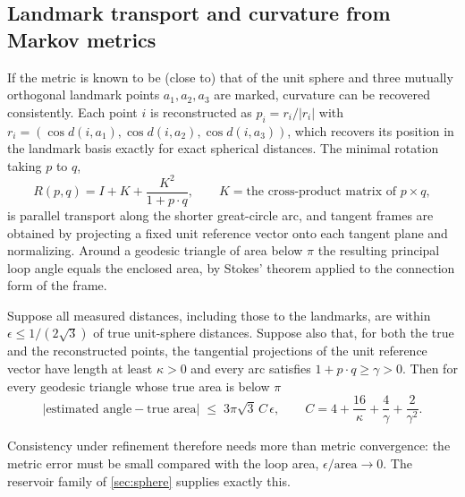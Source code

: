 \subsection{Landmark transport and curvature from Markov metrics}
\label{sec:transport-repair}

If the metric is known to be (close to) that of the unit sphere and three mutually orthogonal landmark points $a_1,a_2,a_3$ are marked, curvature can be recovered consistently.
Each point $i$ is reconstructed as $p_i=r_i/|r_i|$ with $r_i=(\cos d(i,a_1),\cos d(i,a_2),\cos d(i,a_3))$, which recovers its position in the landmark basis exactly for exact spherical distances.
The minimal rotation taking $p$ to $q$,
\begin{equation}
R(p,q)=I+K+\frac{K^2}{1+p\cdot q},\qquad K=\text{the cross-product matrix of }p\times q,
\end{equation}
is parallel transport along the shorter great-circle arc, and tangent frames are obtained by projecting a fixed unit reference vector onto each tangent plane and normalizing.
Around a geodesic triangle of area below $\pi$ the resulting principal loop angle equals the enclosed area, by Stokes' theorem applied to the connection form of the frame.

\begin{theorem}
\label{thm:landmark}
Suppose all measured distances, including those to the landmarks, are within $\epsilon\le1/(2\sqrt3)$ of true unit-sphere distances.
Suppose also that, for both the true and the reconstructed points, the tangential projections of the unit reference vector have length at least $\kappa>0$ and every arc satisfies $1+p\cdot q\ge\gamma>0$.
Then for every geodesic triangle whose true area is below $\pi$
\begin{equation}
\bigl|\text{estimated angle}-\text{true area}\bigr|\;\le\;3\pi\sqrt3\,C\,\epsilon,
\qquad C=4+\frac{16}{\kappa}+\frac4\gamma+\frac2{\gamma^2}.
\end{equation}
\end{theorem}


Consistency under refinement therefore needs more than metric convergence: the metric error must be small compared with the loop area, $\epsilon/\text{area}\to0$.
The reservoir family of \cref{sec:sphere} supplies exactly this.

